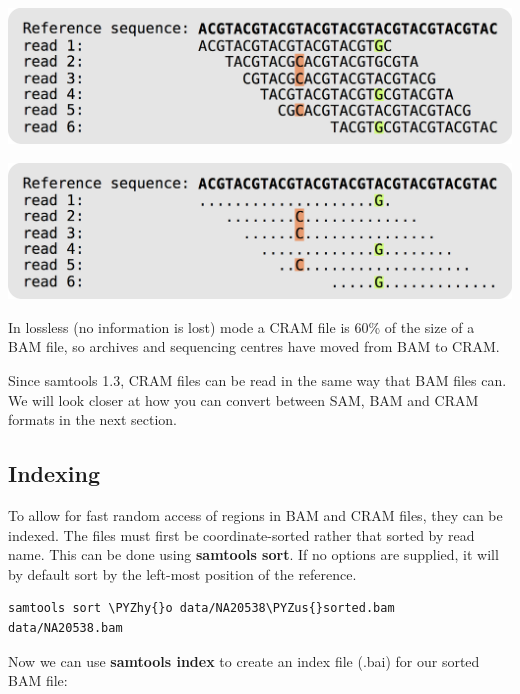 \documentclass[11pt]{article}
\makeatletter
\def\PYZus{\char`\_}
\def\PYZhy{\char`\-}
\newcommand{\boxspacing}{\kern\kvtcb@left@rule\kern\kvtcb@boxsep}
\newcommand{\prompt}[4]{
        \ttfamily\llap{{\color{#2}\LARGE\faKeyboardO\hspace{3pt}#4}}\vspace{-\baselineskip}
    }
\makeatother
\begin{document}
    \includegraphics{img/CRAM_format.png}

    \includegraphics{img/CRAM_format2.png}

    In lossless (no information is lost) mode a CRAM file is 60\% of the
size of a BAM file, so archives and sequencing centres have moved from
BAM to CRAM.

Since samtools 1.3, CRAM files can be read in the same way that BAM
files can. We will look closer at how you can convert between SAM, BAM
and CRAM formats in the next section.

    \hypertarget{indexing}{%
\subsection{Indexing}\label{indexing}}

To allow for fast random access of regions in BAM and CRAM files, they
can be indexed. The files must first be coordinate-sorted rather that
sorted by read name. This can be done using \textbf{samtools sort}. If
no options are supplied, it will by default sort by the left-most
position of the reference.

    \begin{tcolorbox}[breakable, size=fbox, boxrule=1pt, pad at break*=1mm,colback=cellbackground, colframe=cellborder]
\prompt{In}{incolor}{ }{\boxspacing}
\begin{Verbatim}[commandchars=\\\{\}]
samtools sort \PYZhy{}o data/NA20538\PYZus{}sorted.bam data/NA20538.bam
\end{Verbatim}
\end{tcolorbox}

    Now we can use \textbf{samtools index} to create an index file (.bai)
for our sorted BAM file:
\end{document}
